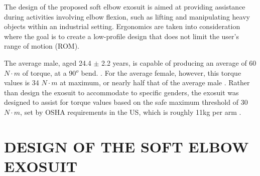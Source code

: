 \documentclass[letterpaper, 10 pt, conference]{ieeeconf}  %
\begin{document}
The design of the proposed soft elbow exosuit is aimed at providing assistance during activities involving elbow flexion, such as lifting and manipulating heavy objects within an industrial setting. Ergonomics are taken into consideration where the goal is to create a low-profile design that does not limit the user’s range of motion (ROM). 

The average male, aged 24.4 $\pm$ 2.2 years, is capable of producing an average of 60 $N \cdot m$ of torque, at a 90$^o$ bend. \cite{sardelli2011functional}. For the average female, however, this torque values is 34 $N \cdot m$ at maximum, or nearly half that of the average male \cite{laksanacharoen2003design}. Rather than design the exosuit to accommodate to specific genders, the exosuit was designed to assist for torque values based on the safe maximum threshold of 30 $N\cdot{m}$, set by OSHA requirements in the US, which is roughly 11kg per arm \cite{waters1994applications} .  

\section{DESIGN OF THE SOFT ELBOW EXOSUIT}
\end{document}
